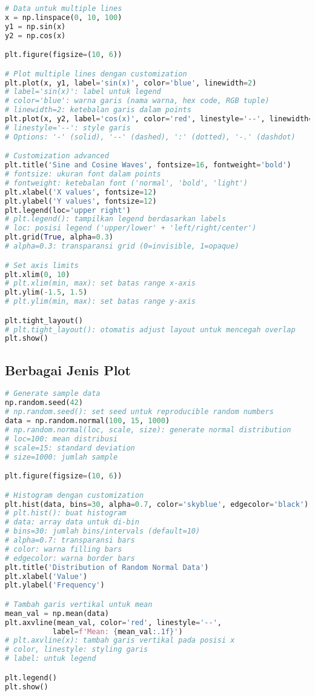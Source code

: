 \begin{lstlisting}[language=python, caption={Plot dengan Multiple Lines dan Styling}, style=python]
# Data untuk multiple lines
x = np.linspace(0, 10, 100)
y1 = np.sin(x)
y2 = np.cos(x)

plt.figure(figsize=(10, 6))

# Plot multiple lines dengan customization
plt.plot(x, y1, label='sin(x)', color='blue', linewidth=2)
# label='sin(x)': label untuk legend
# color='blue': warna garis (nama warna, hex code, RGB tuple)
# linewidth=2: ketebalan garis dalam points
plt.plot(x, y2, label='cos(x)', color='red', linestyle='--', linewidth=2)
# linestyle='--': style garis
# Options: '-' (solid), '--' (dashed), ':' (dotted), '-.' (dashdot)

# Customization advanced
plt.title('Sine and Cosine Waves', fontsize=16, fontweight='bold')
# fontsize: ukuran font dalam points
# fontweight: ketebalan font ('normal', 'bold', 'light')
plt.xlabel('X values', fontsize=12)
plt.ylabel('Y values', fontsize=12)
plt.legend(loc='upper right')
# plt.legend(): tampilkan legend berdasarkan labels
# loc: posisi legend ('upper/lower' + 'left/right/center')
plt.grid(True, alpha=0.3)
# alpha=0.3: transparansi grid (0=invisible, 1=opaque)

# Set axis limits
plt.xlim(0, 10)
# plt.xlim(min, max): set batas range x-axis
plt.ylim(-1.5, 1.5)
# plt.ylim(min, max): set batas range y-axis

plt.tight_layout()
# plt.tight_layout(): otomatis adjust layout untuk mencegah overlap
plt.show()
\end{lstlisting}

\subsection*{Berbagai Jenis Plot}

\begin{lstlisting}[language=python, caption={Histogram untuk Distribusi Data}, style=python]
# Generate sample data
np.random.seed(42)
# np.random.seed(): set seed untuk reproducible random numbers
data = np.random.normal(100, 15, 1000)
# np.random.normal(loc, scale, size): generate normal distribution
# loc=100: mean distribusi
# scale=15: standard deviation
# size=1000: jumlah sample

plt.figure(figsize=(10, 6))

# Histogram dengan customization
plt.hist(data, bins=30, alpha=0.7, color='skyblue', edgecolor='black')
# plt.hist(): buat histogram
# data: array data untuk di-bin
# bins=30: jumlah bins/intervals (default=10)
# alpha=0.7: transparansi bars
# color: warna filling bars
# edgecolor: warna border bars
plt.title('Distribution of Random Normal Data')
plt.xlabel('Value')
plt.ylabel('Frequency')

# Tambah garis vertikal untuk mean
mean_val = np.mean(data)
plt.axvline(mean_val, color='red', linestyle='--',
           label=f'Mean: {mean_val:.1f}')
# plt.axvline(x): tambah garis vertikal pada posisi x
# color, linestyle: styling garis
# label: untuk legend

plt.legend()
plt.show()
\end{lstlisting}

